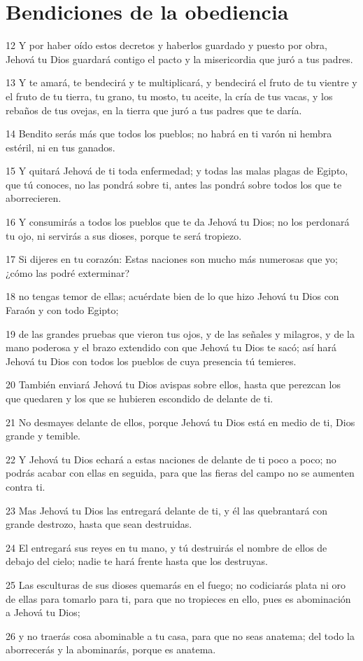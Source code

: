 \section{Bendiciones de la obediencia }

\par 12 Y por haber oído estos decretos y haberlos guardado y puesto por obra, Jehová tu Dios guardará contigo el pacto y la misericordia que juró a tus padres.
\par 13 Y te amará, te bendecirá y te multiplicará, y bendecirá el fruto de tu vientre y el fruto de tu tierra, tu grano, tu mosto, tu aceite, la cría de tus vacas, y los rebaños de tus ovejas, en la tierra que juró a tus padres que te daría.
\par 14 Bendito serás más que todos los pueblos; no habrá en ti varón ni hembra estéril, ni en tus ganados.
\par 15 Y quitará Jehová de ti toda enfermedad; y todas las malas plagas de Egipto, que tú conoces, no las pondrá sobre ti, antes las pondrá sobre todos los que te aborrecieren.
\par 16 Y consumirás a todos los pueblos que te da Jehová tu Dios; no los perdonará tu ojo, ni servirás a sus dioses, porque te será tropiezo.
\par 17 Si dijeres en tu corazón: Estas naciones son mucho más numerosas que yo; ¿cómo las podré exterminar?
\par 18 no tengas temor de ellas; acuérdate bien de lo que hizo Jehová tu Dios con Faraón y con todo Egipto;
\par 19 de las grandes pruebas que vieron tus ojos, y de las señales y milagros, y de la mano poderosa y el brazo extendido con que Jehová tu Dios te sacó; así hará Jehová tu Dios con todos los pueblos de cuya presencia tú temieres.
\par 20 También enviará Jehová tu Dios avispas sobre ellos, hasta que perezcan los que quedaren y los que se hubieren escondido de delante de ti.
\par 21 No desmayes delante de ellos, porque Jehová tu Dios está en medio de ti, Dios grande y temible.
\par 22 Y Jehová tu Dios echará a estas naciones de delante de ti poco a poco; no podrás acabar con ellas en seguida, para que las fieras del campo no se aumenten contra ti.
\par 23 Mas Jehová tu Dios las entregará delante de ti, y él las quebrantará con grande destrozo, hasta que sean destruidas.
\par 24 El entregará sus reyes en tu mano, y tú destruirás el nombre de ellos de debajo del cielo; nadie te hará frente hasta que los destruyas.
\par 25 Las esculturas de sus dioses quemarás en el fuego; no codiciarás plata ni oro de ellas para tomarlo para ti, para que no tropieces en ello, pues es abominación a Jehová tu Dios;
\par 26 y no traerás cosa abominable a tu casa, para que no seas anatema; del todo la aborrecerás y la abominarás, porque es anatema.

